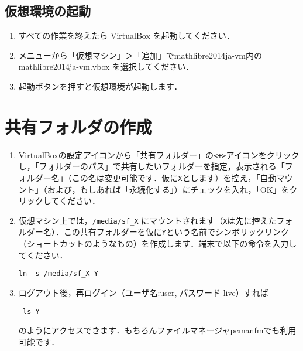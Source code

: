 \documentclass[a4j]{jsarticle}
\newcommand{\vm}{mathlibre2014ja-vm}
\begin{document}

\subsection{仮想環境の起動}
\begin{enumerate}
 \item すべての作業を終えたら VirtualBox を起動してください．
 \item メニューから「仮想マシン」＞「追加」で\vm 内の \vm.vbox を選択してください．
 \item 起動ボタンを押すと仮想環境が起動します．
\end{enumerate}

\section{共有フォルダの作成}
\begin{enumerate}
 \item VirtualBoxの設定アイコンから「共有フォルダー」の\verb|<+>|アイコンをクリックし，「フォルダーのパス」で共有したいフォルダーを指定，表示される「フォルダー名」（この名は変更可能です．仮に\verb|X|とします）を控え，「自動マウント」（および，もしあれば「永続化する」）にチェックを入れ，「OK」をクリックしてください．
 \item 仮想マシン上では，\verb|/media/sf_X| にマウントされます（\verb|X|は先に控えたフォルダー名）．この共有フォルダーを仮に\verb|Y|という名前でシンボリックリンク（ショートカットのようなもの）を作成します．端末で以下の命令を入力してください．
\begin{lstlisting}
ln -s /media/sf_X Y
\end{lstlisting}
\item ログアウト後，再ログイン（ユーザ名:user, パスワード live）すれば
\begin{lstlisting}
 ls Y
\end{lstlisting}
のようにアクセスできます．もちろんファイルマネージャpcmanfmでも利用可能です．
\end{enumerate}

\end{document}
